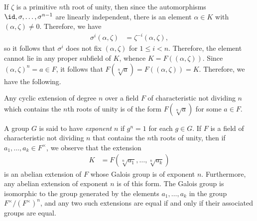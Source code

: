 \documentclass[10pt]{mypackage}
\begin{document}
If $\zeta$ is a primitive $n$th root of unity, then since the automorphisms $\id,\sigma,\dots,\sigma^{n-1}$ are linearly independent, there is an element $\alpha\in K$ with $\left( \alpha,\zeta \right)\neq 0$. Therefore, we have
\begin{align*}
  \sigma^{i}\left( \alpha,\zeta \right) &= \zeta^{-i} \left( \alpha,\zeta \right),
\end{align*}
so it follows that $\sigma^{i}$ does not fix $\left( \alpha,\zeta \right)$ for $1 \leq i < n$. Therefore, the element cannot lie in any proper subfield of $K$, whence $K = F\left( \left( \alpha,\zeta \right) \right)$. Since $\left( \alpha,\zeta \right)^{n} = a\in F$, it follows that $F\left( \sqrt[n]{a} \right) = F\left( \left( \alpha,\zeta \right) \right)= K$. Therefore, we have the following.
\begin{proposition}
  Any cyclic extension of degree $n$ over a field $F$ of characteristic not dividing $n$ which contains the $n$th roots of unity is of the form $F\left( \sqrt[n]{a} \right)$ for some $a\in F$.
\end{proposition}
A group $G$ is said to have \textit{exponent} $n$ if $g^{n} = 1$ for each $g\in G$. If $F$ is a field of characteristic not dividing $n$ that contains the $n$th roots of unity, then if $a_1,\dots,a_k\in F^{\times}$, we observe that the extension
\begin{align*}
  K &= F\left( \sqrt[n]{a_1},\dots,\sqrt[n]{a_k} \right)
\end{align*}
is an abelian extension of $F$ whose Galois group is of exponent $n$. Furthermore, any abelian extension of exponent $n$ is of this form. The Galois group is isomorphic to the group generated by the elements $a_1,\dots,a_k$ in the group $F^{\times}/\left( F^{\times} \right)^{n}$, and any two such extensions are equal if and only if their associated groups are equal.
\end{document}
